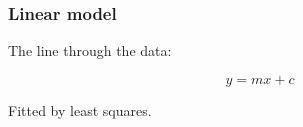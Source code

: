 \documentclass{beamer}
\begin{document}
\begin{frame}
\frametitle{Linear model}
The line through the data:
\begin{center}
$$y = mx + c$$
\end{center}
Fitted by least squares.
\end{frame}
\end{document}
